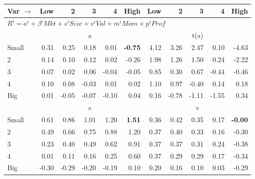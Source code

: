 
\begin{tabular}{lrrrrrrrrrr}
  \toprule
    
    Var $\rightarrow$ & Low & 2 & 3 & 4 & High & Low & 2 & 3 & 4 & High  \\ 
  \midrule
  \multicolumn{11}{l}{$R^i=a^i+\beta^iMkt+s^iSize+v^iVal+m^iMom+p^iProf$}  \\
  
     & \multicolumn{5}{c}{a} & \multicolumn{5}{c}{t(a)}   \\
     \cmidrule(r){2-6} \cmidrule(r){7-11} 
    Small  & 0.31  & 0.25  & 0.18  & 0.01  & \textbf{-0.75}  & 4.12  & 3.26  & 2.47  & 0.10  & -4.63   \\
    2  & 0.14  & 0.10  & 0.12  & 0.02  & -0.26  & 1.98  & 1.26  & 1.50  & 0.24  & -2.22   \\
    3  & 0.07  & 0.02  & 0.06  & -0.04  & -0.05  & 0.85  & 0.30  & 0.67  & -0.44  & -0.46   \\
    4  & 0.10  & 0.08  & -0.03  & 0.01  & 0.02  & 1.10  & 0.97  & -0.40  & 0.14  & 0.18   \\
    Big  & 0.01  & -0.05  & -0.07  & -0.10  & 0.04  & 0.16  & -0.78  & -1.11  & -1.55  & 0.34   \\
    
  
    
  
     & \multicolumn{5}{c}{s} & \multicolumn{5}{c}{v}   \\
     \cmidrule(r){2-6} \cmidrule(r){7-11} 
    Small  & 0.61  & 0.86  & 1.01  & 1.20  & \textbf{1.51}  & 0.36  & 0.42  & 0.35  & 0.17  & \textbf{-0.00}   \\
    2  & 0.49  & 0.66  & 0.75  & 0.88  & 1.20  & 0.37  & 0.40  & 0.33  & 0.16  & -0.30   \\
    3  & 0.23  & 0.40  & 0.49  & 0.62  & 0.91  & 0.37  & 0.37  & 0.31  & 0.24  & -0.38   \\
    4  & 0.01  & 0.11  & 0.16  & 0.25  & 0.60  & 0.37  & 0.29  & 0.29  & 0.17  & -0.34   \\
    Big  & -0.30  & -0.29  & -0.20  & -0.19  & 0.10  & 0.20  & 0.16  & 0.10  & 0.03  & -0.29   \\
    

\end{tabular}

